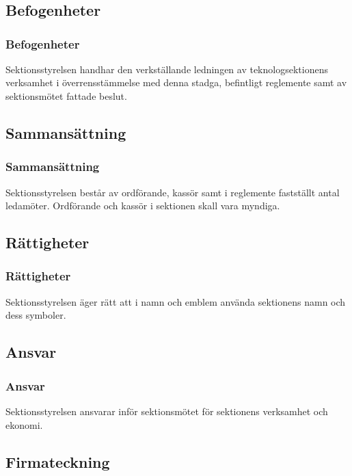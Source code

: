 \section{\STYRITFULL}

\subsection{Befogenheter}

\subsubsection{Befogenheter}
Sektionsstyrelsen handhar den verkställande ledningen av teknologsektionens verksamhet i överrensstämmelse med denna stadga, befintligt reglemente samt av sektionsmötet fattade beslut.

\subsection{Sammansättning}

\subsubsection{Sammansättning}
Sektionsstyrelsen består av ordförande, kassör samt i reglemente fastställt antal ledamöter. Ordförande och kassör i sektionen skall vara myndiga.

\subsection{Rättigheter}

\subsubsection{Rättigheter}
Sektionsstyrelsen äger rätt att i namn och emblem använda sektionens namn och dess symboler.

\subsection{Ansvar}

\subsubsection{Ansvar}
Sektionsstyrelsen ansvarar inför sektionsmötet för sektionens verksamhet och ekonomi.

\subsection{Firmateckning}


